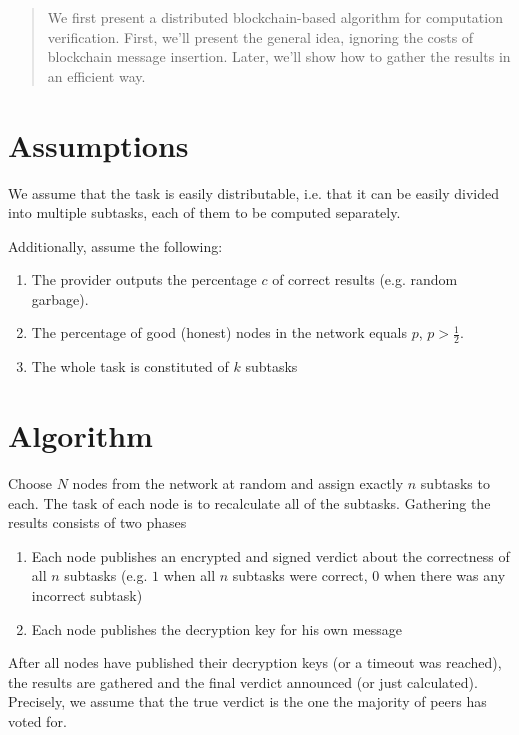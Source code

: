 \documentclass[12pt]{article}
\begin{document}
\maketitle

\begin{abstract}
We first present a distributed blockchain-based algorithm for computation verification. 
First, we'll present the general idea, ignoring the costs of blockchain message insertion. 
Later, we'll show how to gather the results in an efficient way.
\end{abstract}

\section{Assumptions}

We assume that the task is easily distributable, 
i.e. that it can be easily divided into multiple subtasks, 
each of them to be computed separately.

Additionally, assume the following:
\begin{enumerate}
	\item The provider outputs the percentage $c$ of correct results (e.g. random garbage).
	\item The percentage of good (honest) nodes in the network equals $p$, $p > \frac{1}{2}$.
	\item The whole task is constituted of $k$ subtasks
\end{enumerate}

\section{Algorithm}
Choose $N$ nodes from the network at random and assign exactly $n$ subtasks to each.
The task of each node is to recalculate all of the subtasks. Gathering the results 
consists of two phases

\begin{enumerate}
	\item Each node publishes an encrypted and signed verdict about the correctness of all $n$ subtasks (e.g. $1$ when all $n$ subtasks were correct, $0$ when there was any incorrect subtask)
	\item Each node publishes the decryption key for his own message
\end{enumerate}

After all nodes have published their decryption keys (or a timeout was reached), the results are gathered and the final verdict announced (or just calculated).
Precisely, we assume that the true verdict is the one the majority of peers has voted for.
\end{document}
